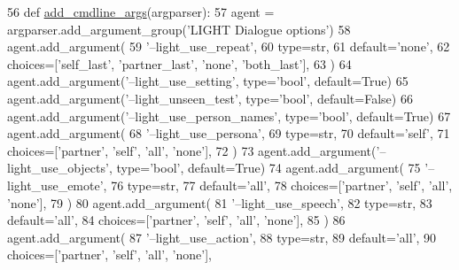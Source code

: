 \begin{DoxyCode}
56     \textcolor{keyword}{def }\hyperlink{namespaceparlai_1_1agents_1_1drqa_1_1config_a62fdd5554f1da6be0cba185271058320}{add\_cmdline\_args}(argparser):
57         agent = argparser.add\_argument\_group(\textcolor{stringliteral}{'LIGHT Dialogue options'})
58         agent.add\_argument(
59             \textcolor{stringliteral}{'--light\_use\_repeat'},
60             type=str,
61             default=\textcolor{stringliteral}{'none'},
62             choices=[\textcolor{stringliteral}{'self\_last'}, \textcolor{stringliteral}{'partner\_last'}, \textcolor{stringliteral}{'none'}, \textcolor{stringliteral}{'both\_last'}],
63         )
64         agent.add\_argument(\textcolor{stringliteral}{'--light\_use\_setting'}, type=\textcolor{stringliteral}{'bool'}, default=\textcolor{keyword}{True})
65         agent.add\_argument(\textcolor{stringliteral}{'--light\_unseen\_test'}, type=\textcolor{stringliteral}{'bool'}, default=\textcolor{keyword}{False})
66         agent.add\_argument(\textcolor{stringliteral}{'--light\_use\_person\_names'}, type=\textcolor{stringliteral}{'bool'}, default=\textcolor{keyword}{True})
67         agent.add\_argument(
68             \textcolor{stringliteral}{'--light\_use\_persona'},
69             type=str,
70             default=\textcolor{stringliteral}{'self'},
71             choices=[\textcolor{stringliteral}{'partner'}, \textcolor{stringliteral}{'self'}, \textcolor{stringliteral}{'all'}, \textcolor{stringliteral}{'none'}],
72         )
73         agent.add\_argument(\textcolor{stringliteral}{'--light\_use\_objects'}, type=\textcolor{stringliteral}{'bool'}, default=\textcolor{keyword}{True})
74         agent.add\_argument(
75             \textcolor{stringliteral}{'--light\_use\_emote'},
76             type=str,
77             default=\textcolor{stringliteral}{'all'},
78             choices=[\textcolor{stringliteral}{'partner'}, \textcolor{stringliteral}{'self'}, \textcolor{stringliteral}{'all'}, \textcolor{stringliteral}{'none'}],
79         )
80         agent.add\_argument(
81             \textcolor{stringliteral}{'--light\_use\_speech'},
82             type=str,
83             default=\textcolor{stringliteral}{'all'},
84             choices=[\textcolor{stringliteral}{'partner'}, \textcolor{stringliteral}{'self'}, \textcolor{stringliteral}{'all'}, \textcolor{stringliteral}{'none'}],
85         )
86         agent.add\_argument(
87             \textcolor{stringliteral}{'--light\_use\_action'},
88             type=str,
89             default=\textcolor{stringliteral}{'all'},
90             choices=[\textcolor{stringliteral}{'partner'}, \textcolor{stringliteral}{'self'}, \textcolor{stringliteral}{'all'}, \textcolor{stringliteral}{'none'}],

\end{DoxyCode}

